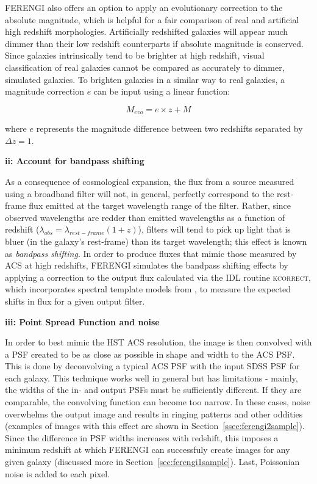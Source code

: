 FERENGI also offers an option to apply an evolutionary correction to the absolute magnitude, which is helpful for a fair comparison of real and artificial high redshift morphologies. Artificially redshifted galaxies will appear much dimmer than their low redshift counterparts if absolute magnitude is conserved.  Since galaxies intrinsically tend to be brighter at high redshift, visual classification of real galaxies cannot be compared as accurately to dimmer, simulated galaxies. To brighten galaxies in a similar way to real galaxies, a magnitude correction $e$ can be input using a linear function:

\begin{equation}
M_{evo} = e \times z + M
\label{eqn:ferengievolution}
\end{equation}

where $e$ represents the magnitude difference between two redshifts separated by $\Delta z=1$. 

\textbf{ii: Account for bandpass shifting} 

As a consequence of cosmological expansion, the flux from a source measured using a broadband filter will not, in general, perfectly correspond to the rest-frame flux emitted at the target wavelength range of the filter. Rather, since observed wavelengths are redder than emitted wavelengths as a function of redshift ($\lambda_{obs}=\lambda_{rest-frame}(1+z)$), filters will tend to pick up light that is bluer (in the galaxy's rest-frame) than its target wavelength; this effect is known as \emph{bandpass shifting}. In order to produce fluxes that mimic those measured by ACS at high redshifts, FERENGI simulates the bandpass shifting effects by applying a correction to the output flux calculated via the IDL routine \textsc{kcorrect}, which incorporates spectral template models from \citet{Bruzual2003}, to measure the expected shifts in flux for a given output filter.   

\textbf{iii: Point Spread Function and noise}

In order to best mimic the HST ACS resolution, the image is then convolved with a PSF created to be as close as possible in shape and width to the ACS PSF. This is done by deconvolving a typical ACS PSF with the input SDSS PSF for each galaxy. This technique works well in general but has limitations - mainly, the widths of the in- and output PSFs must be sufficiently different. If they are comparable, the convolving function can become too narrow. In these cases, noise overwhelms the output image and results in ringing patterns and other oddities (examples of images with this effect are shown in Section~\ref{ssec:ferengi2sample}). Since the difference in PSF widths increases with redshift, this imposes a minimum redshift at which FERENGI can successfuly create images for any given galaxy (discussed more in Section~\ref{sec:ferengi1sample}). Last, Poissonian noise is added to each pixel.



